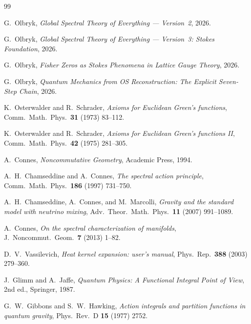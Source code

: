 \documentclass[12pt]{article}
\theoremstyle{definition}
\theoremstyle{remark}
\begin{document}
\begin{thebibliography}{99}

G.~Olbryk,
\emph{Global Spectral Theory of Everything --- Version~2},
2026.

G.~Olbryk,
\emph{Global Spectral Theory of Everything --- Version~3:
Stokes Foundation},
2026.

G.~Olbryk,
\emph{Fisher Zeros as Stokes Phenomena in Lattice Gauge Theory},
2026.

G.~Olbryk,
\emph{Quantum Mechanics from OS Reconstruction:
The Explicit Seven-Step Chain},
2026.

K.~Osterwalder and R.~Schrader,
\emph{Axioms for Euclidean Green's functions},
Comm.\ Math.\ Phys.\ \textbf{31} (1973) 83--112.

K.~Osterwalder and R.~Schrader,
\emph{Axioms for Euclidean Green's functions II},
Comm.\ Math.\ Phys.\ \textbf{42} (1975) 281--305.

A.~Connes,
\emph{Noncommutative Geometry},
Academic Press, 1994.

A.~H.~Chamseddine and A.~Connes,
\emph{The spectral action principle},
Comm.\ Math.\ Phys.\ \textbf{186} (1997) 731--750.

A.~H.~Chamseddine, A.~Connes, and M.~Marcolli,
\emph{Gravity and the standard model with neutrino mixing},
Adv.\ Theor.\ Math.\ Phys.\ \textbf{11} (2007) 991--1089.

A.~Connes,
\emph{On the spectral characterization of manifolds},
J.\ Noncommut.\ Geom.\ \textbf{7} (2013) 1--82.

D.~V.~Vassilevich,
\emph{Heat kernel expansion: user's manual},
Phys.\ Rep.\ \textbf{388} (2003) 279--360.

J.~Glimm and A.~Jaffe,
\emph{Quantum Physics: A Functional Integral Point of View},
2nd ed., Springer, 1987.

G.~W.~Gibbons and S.~W.~Hawking,
\emph{Action integrals and partition functions in quantum gravity},
Phys.\ Rev.\ D \textbf{15} (1977) 2752.

\end{thebibliography}
\end{document}

